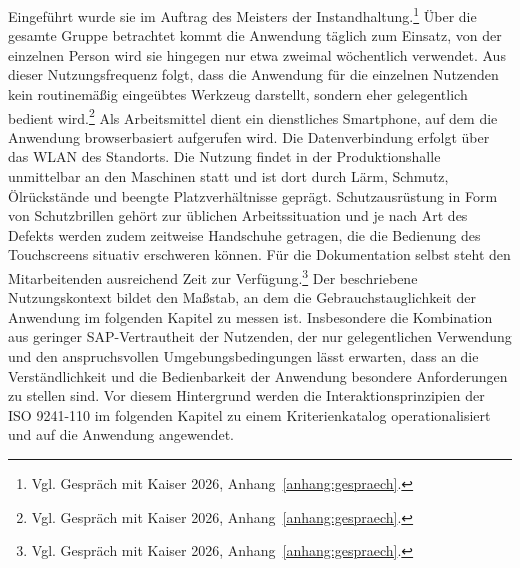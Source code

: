 Eingeführt wurde sie im Auftrag des Meisters der Instandhaltung.\footnote{Vgl. Gespräch mit Kaiser 2026, Anhang~\ref{anhang:gespraech}.} 
Über die gesamte Gruppe betrachtet kommt die Anwendung täglich zum Einsatz, von der einzelnen 
Person wird sie hingegen nur etwa zweimal wöchentlich verwendet. Aus dieser Nutzungsfrequenz folgt, dass die Anwendung für die einzelnen 
Nutzenden kein routinemäßig eingeübtes Werkzeug darstellt, sondern eher gelegentlich bedient wird.\footnote{Vgl. Gespräch mit Kaiser 2026, Anhang~\ref{anhang:gespraech}.}
Als Arbeitsmittel dient ein dienstliches Smartphone, auf dem die Anwendung browserbasiert aufgerufen wird. Die Datenverbindung erfolgt 
über das \ac{WLAN} des Standorts. Die Nutzung findet in der Produktionshalle unmittelbar an den Maschinen statt und ist dort durch Lärm, 
Schmutz, Ölrückstände und beengte Platzverhältnisse geprägt. Schutzausrüstung in Form von Schutzbrillen gehört zur üblichen 
Arbeitssituation und je nach Art des Defekts werden zudem zeitweise Handschuhe getragen, die die Bedienung des Touchscreens situativ 
erschweren können. Für die Dokumentation selbst steht den Mitarbeitenden ausreichend Zeit zur 
Verfügung.\footnote{Vgl. Gespräch mit Kaiser 2026, Anhang~\ref{anhang:gespraech}.}
Der beschriebene Nutzungskontext bildet den Maßstab, an dem die Gebrauchstauglichkeit der Anwendung im folgenden Kapitel zu messen ist. 
Insbesondere die Kombination aus geringer SAP-Vertrautheit der Nutzenden, der nur gelegentlichen Verwendung und den anspruchsvollen 
Umgebungsbedingungen lässt erwarten, dass an die Verständlichkeit und die Bedienbarkeit der Anwendung besondere Anforderungen zu stellen 
sind. Vor diesem Hintergrund werden die Interaktionsprinzipien der ISO 9241-110 im folgenden Kapitel zu einem Kriterienkatalog 
operationalisiert und auf die Anwendung angewendet.

